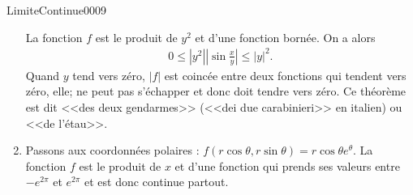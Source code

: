 \begin{corrige}{LimiteContinue0009}
\begin{enumerate}
		La fonction $f$ est le produit de $y^2$ et d'une fonction bornée. On a alors 
          \begin{equation}
            \begin{aligned}
              0\leq |y^2|\left|\sin\frac{x}{y}\right|\leq |y|^2.
            \end{aligned}  
          \end{equation}
          Quand $y$ tend vers zéro, $|f|$ est coincée entre deux fonctions qui tendent vers zéro, elle; ne peut pas s'échapper et donc doit tendre vers zéro. Ce théorème est dit <<des deux gendarmes>> (<<dei due carabinieri>> en italien) ou <<de l'étau>>.
          \item Passons aux coordonnées polaires : $f(r\cos\theta, r\sin\theta )= r\cos\theta e^\theta$. La fonction $f$ est le produit de $x$ et d'une fonction qui prends ses valeurs entre $-e^{2\pi}$ et $e^{2\pi}$ et est donc continue partout. 
          
  \end{enumerate}

\end{corrige}
